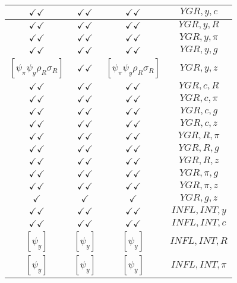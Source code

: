\documentclass[a4paper,10pt]{article}
\begin{document}
\begin{longtable}{|c|c|c|c|}
\hline
$\checkmark\checkmark$ & $\checkmark\checkmark$ & $\checkmark\checkmark$ & ${YGR},{y},{c}$ \\
\hline
$\checkmark\checkmark$ & $\checkmark\checkmark$ & $\checkmark\checkmark$ & ${YGR},{y},{R}$ \\
\hline
$\checkmark\checkmark$ & $\checkmark\checkmark$ & $\checkmark\checkmark$ & ${YGR},{y},{\pi}$ \\
\hline
$\checkmark\checkmark$ & $\checkmark\checkmark$ & $\checkmark\checkmark$ & ${YGR},{y},{g}$ \\
\hline
$[\psi_\pi \psi_y \rho_R \sigma_R ]$ & $\checkmark\checkmark$ & $[\psi_\pi \psi_y \rho_R \sigma_R ]$ & ${YGR},{y},{z}$ \\
\hline
$\checkmark\checkmark$ & $\checkmark\checkmark$ & $\checkmark\checkmark$ & ${YGR},{c},{R}$ \\
\hline
$\checkmark\checkmark$ & $\checkmark\checkmark$ & $\checkmark\checkmark$ & ${YGR},{c},{\pi}$ \\
\hline
$\checkmark\checkmark$ & $\checkmark\checkmark$ & $\checkmark\checkmark$ & ${YGR},{c},{g}$ \\
\hline
$\checkmark\checkmark$ & $\checkmark\checkmark$ & $\checkmark\checkmark$ & ${YGR},{c},{z}$ \\
\hline
$\checkmark\checkmark$ & $\checkmark\checkmark$ & $\checkmark\checkmark$ & ${YGR},{R},{\pi}$ \\
\hline
$\checkmark\checkmark$ & $\checkmark\checkmark$ & $\checkmark\checkmark$ & ${YGR},{R},{g}$ \\
\hline
$\checkmark\checkmark$ & $\checkmark\checkmark$ & $\checkmark\checkmark$ & ${YGR},{R},{z}$ \\
\hline
$\checkmark\checkmark$ & $\checkmark\checkmark$ & $\checkmark\checkmark$ & ${YGR},{\pi},{g}$ \\
\hline
$\checkmark\checkmark$ & $\checkmark\checkmark$ & $\checkmark\checkmark$ & ${YGR},{\pi},{z}$ \\
\hline
$\checkmark$ & $\checkmark$ & $\checkmark$ & ${YGR},{g},{z}$ \\
\hline
$\checkmark\checkmark$ & $\checkmark\checkmark$ & $\checkmark\checkmark$ & ${INFL},{INT},{y}$ \\
\hline
$\checkmark\checkmark$ & $\checkmark\checkmark$ & $\checkmark\checkmark$ & ${INFL},{INT},{c}$ \\
\hline
$[\psi_y ]$ & $[\psi_y ]$ & $[\psi_y ]$ & ${INFL},{INT},{R}$ \\
\hline
$[\psi_y ]$ & $[\psi_y ]$ & $[\psi_y ]$ & ${INFL},{INT},{\pi}$ \\

\end{longtable}
\end{document}
